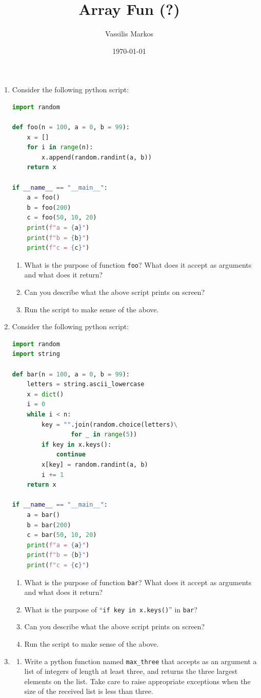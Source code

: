 \documentclass[a4paper, 11pt]{article}
\title{Array Fun (?)}
\author{Vassilis Markos}
\date{\today}
\theoremstyle{definition}
\begin{document}
	\maketitle
	
	\begin{enumerate}[label = E\arabic*.]
		\item Consider the following python script:
		\begin{lstlisting}[language=Python]
import random

def foo(n = 100, a = 0, b = 99):
	x = []
	for i in range(n):
		x.append(random.randint(a, b))
	return x

if __name__ == "__main__":
	a = foo()
	b = foo(200)
	c = foo(50, 10, 20)
	print(f"a = {a}")
	print(f"b = {b}")
	print(f"c = {c}")
		\end{lstlisting}
		\begin{enumerate}
			\item What is the purpose of function \texttt{foo}? What does it accept as arguments and what does it return?
			\item Can you describe what the above script prints on screen?
			\item Run the script to make sense of the above.
		\end{enumerate}
		\item Consider the following python script:
		\begin{lstlisting}[language=Python]
import random
import string

def bar(n = 100, a = 0, b = 99):
	letters = string.ascii_lowercase
	x = dict()
	i = 0
	while i < n:
		key = "".join(random.choice(letters)\
			  	for _ in range(5))
		if key in x.keys():
			continue
		x[key] = random.randint(a, b)
		i += 1
	return x

if __name__ == "__main__":
	a = bar()
	b = bar(200)
	c = bar(50, 10, 20)
	print(f"a = {a}")
	print(f"b = {b}")
	print(f"c = {c}")
		\end{lstlisting}
		\begin{enumerate}
			\item What is the purpose of function \texttt{bar}? What does it accept as arguments and what does it return?
			\item What is the purpose of ``\texttt{if key in x.keys()}'' in \texttt{bar}?
			\item Can you describe what the above script prints on screen?
			\item Run the script to make sense of the above.
		\end{enumerate}
		\item
		\begin{enumerate}
			\item Write a python function named \texttt{max\_three} that accepts as an argument a list of integers of length at least three, and returns the three largest elements on the list. Take care to raise appropriate exceptions when the size of the received list is less than three.
			

\end{enumerate}
\end{enumerate}
\end{document}

